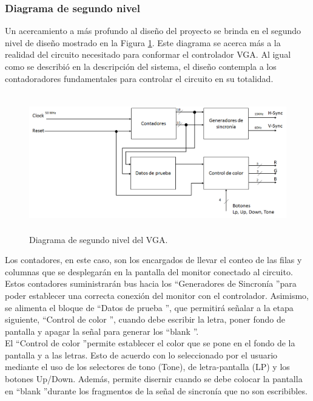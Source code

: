 \documentclass[12pt,a4paper]{article}
\begin{document}
\subsubsection{Diagrama de segundo nivel} \label{sec:VGA_sn}
Un acercamiento a más profundo al diseño del proyecto se brinda en el segundo nivel de diseño mostrado en la Figura \ref{fig:SegundoNivel}. Este diagrama se acerca más a la realidad del circuito necesitado para conformar el controlador VGA. Al igual como se describió en la descripción del sistema, el diseño contempla a los contadoradores fundamentales para controlar el circuito en su totalidad. 

\begin{figure}[htbp]
  \centering
    \includegraphics[height=6cm, width=16cm]{Img/SegundoNivel.png}
  \caption[2doNivel]{Diagrama de segundo nivel del VGA.}
  \label{fig:SegundoNivel}
\end{figure}

Los contadores, en este caso, son los encargados de llevar el conteo de las filas y columnas que se desplegarán en la pantalla del monitor conectado al circuito. Estos contadores suministrarán bus hacia los \textquotedblleft Generadores de Sincronía \textquotedblright para poder establecer una correcta conexión del monitor con el controlador. Asimismo, se alimenta el bloque de \textquotedblleft Datos de prueba \textquotedblright, que permitirá señalar a la etapa siguiente, \textquotedblleft Control de color \textquotedblright, cuando debe escribir la letra, poner fondo de pantalla y apagar la señal para generar los \textquotedblleft blank \textquotedblright. \\[2ex]
El \textquotedblleft Control de color \textquotedblright permite establecer el color que se pone en el fondo de la pantalla y a las letras. Esto de acuerdo con lo seleccionado por el usuario mediante el uso de los selectores de tono (Tone), de letra-pantalla (LP) y los botones Up/Down. Además, permite disernir cuando se debe colocar la pantalla en \textquotedblleft blank \textquotedblright durante los fragmentos de la señal de sincronía que no son escribibles.
\end{document}
